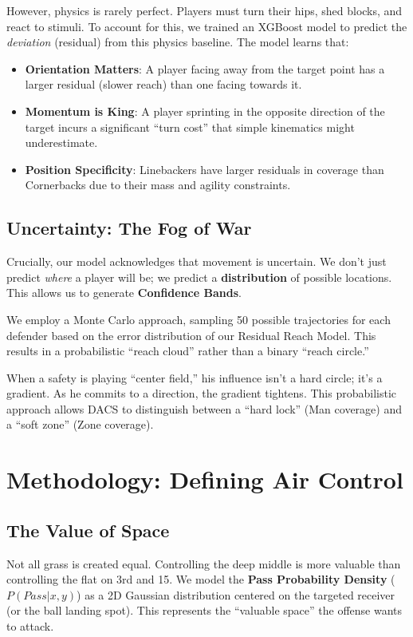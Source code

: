 \documentclass{article}
\begin{document}
However, physics is rarely perfect. Players must turn their hips, shed blocks, and react to stimuli. To account for this, we trained an XGBoost model to predict the \textit{deviation} (residual) from this physics baseline. The model learns that:
\begin{itemize}
    \item \textbf{Orientation Matters}: A player facing away from the target point has a larger residual (slower reach) than one facing towards it.
    \item \textbf{Momentum is King}: A player sprinting in the opposite direction of the target incurs a significant ``turn cost'' that simple kinematics might underestimate.
    \item \textbf{Position Specificity}: Linebackers have larger residuals in coverage than Cornerbacks due to their mass and agility constraints.
\end{itemize}

\subsection{Uncertainty: The Fog of War}
Crucially, our model acknowledges that movement is uncertain. We don't just predict \textit{where} a player will be; we predict a \textbf{distribution} of possible locations. This allows us to generate \textbf{Confidence Bands}. 

We employ a Monte Carlo approach, sampling 50 possible trajectories for each defender based on the error distribution of our Residual Reach Model. This results in a probabilistic ``reach cloud'' rather than a binary ``reach circle.''

When a safety is playing ``center field,'' his influence isn't a hard circle; it's a gradient. As he commits to a direction, the gradient tightens. This probabilistic approach allows DACS to distinguish between a ``hard lock'' (Man coverage) and a ``soft zone'' (Zone coverage).

\section{Methodology: Defining Air Control}

\subsection{The Value of Space}
Not all grass is created equal. Controlling the deep middle is more valuable than controlling the flat on 3rd and 15. We model the \textbf{Pass Probability Density} ($P(Pass|x,y)$) as a 2D Gaussian distribution centered on the targeted receiver (or the ball landing spot). This represents the ``valuable space'' the offense wants to attack.
\end{document}
